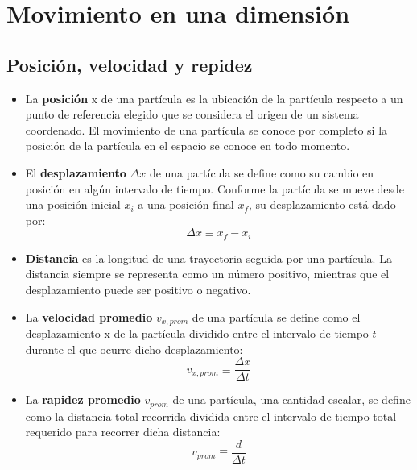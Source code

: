 \section{Movimiento en una dimensión}
  \subsection{Posición, velocidad y repidez}
    \begin{itemize}
      \item La \textbf{posición} x de una partícula es la ubicación de la partícula respecto a un punto de referencia
      elegido que se considera el origen de un sistema coordenado. El movimiento de una partícula se conoce por completo
      si la posición de la partícula en el espacio se conoce en todo momento.

      \item El \textbf{desplazamiento} $\Delta x$ de una partícula se define como su cambio en posición en algún
      intervalo de tiempo. Conforme la partícula se mueve desde una posición inicial $x_{i}$ a una posición final
      $x_{f}$, su desplazamiento está dado por:
      \begin{equation*}
        \Delta x \equiv x_{f} - x_{i}
      \end{equation*}

      \item \textbf{Distancia} es la longitud de una trayectoria seguida por una partícula. La distancia siempre se
      representa como un número positivo, mientras que el desplazamiento puede ser positivo o negativo.

      \item La \textbf{velocidad promedio} $v_{x,prom}$ de una partícula se define como el desplazamiento x de la
      partícula dividido entre el intervalo de tiempo $t$ durante el que ocurre dicho desplazamiento:
      \begin{equation*}
        v_{x,prom} \equiv \frac{\Delta x}{\Delta t}
      \end{equation*}

      \item La \textbf{rapidez promedio} $v_{prom}$ de una partícula, una cantidad escalar, se define como la distancia
      total recorrida dividida entre el intervalo de tiempo total requerido para recorrer dicha distancia:
      \begin{equation*}
        v_{prom} \equiv \frac{d}{\Delta t}
      \end{equation*}
    \end{itemize}

